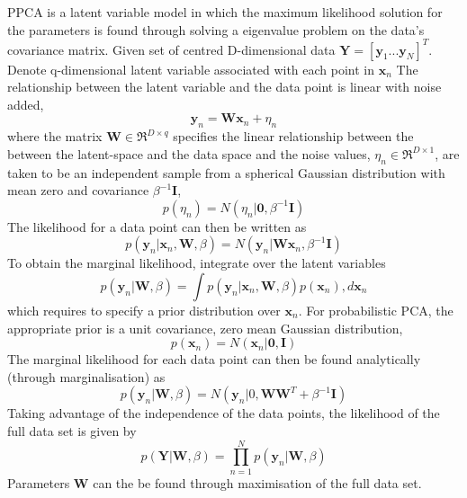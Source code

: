 \documentclass[ %
                    author={Dillon Keith Diep},
                supervisor={Dr. Carl Henrik Ek},
                    degree={MEng},
                     title={Assisted Content Generation for 3D Hair Geometry},
                  subtitle={[INCOMPLETE DRAFT, CONTAINS NOTES FROM RESEARCH]},
                      type={Research},
                      year={2014} ]{dissertation}
\begin{document}
\vspace{10cm}
PPCA is a latent variable model in which the maximum likelihood solution for the parameters is found through solving a eigenvalue problem on the data's covariance matrix.
Given set of centred D-dimensional data $\mathbf{Y}=[\mathbf{y}_1...\mathbf{y}_N]^T$. Denote q-dimensional latent variable associated with each point in $\mathbf{x}_n$
The relationship between the latent variable and the data point is linear with noise added,
\begin{equation}
\mathbf{y}_n=\mathbf{Wx}_n+\eta_n
\end{equation}
where the matrix $\mathbf{W}\in\Re^{D\times q}$ specifies the linear relationship between the between the latent-space and the data space and the noise values, $\eta_n\in\Re^{D\times 1}$, are taken to be an independent sample from a spherical Gaussian distribution with mean zero and covariance $\beta^{-1}\mathbf{I}$,
\begin{equation}
p(\eta_n)=N(\eta_n|\mathbf{0},\beta^{-1}\mathbf{I})
\end{equation}
The likelihood for a data point can then be written as 
\begin{equation}
p(\mathbf{y}_n|\mathbf{x}_n,\mathbf{W},\beta)=N(\mathbf{y}_n|\mathbf{Wx}_n,\beta^{-1}\mathbf{I})
\end{equation}
To obtain the marginal likelihood, integrate over the latent variables
\begin{equation}
p(\mathbf{y}_n|\mathbf{W},\beta)=\int p(\mathbf{y}_n|\mathbf{x}_n, \mathbf{W},\beta)p(\mathbf{x}_n),d\mathbf{x}_n
\end{equation}
which requires to specify a prior distribution over $\mathbf{x}_n$. For probabilistic PCA, the appropriate prior is a unit covariance, zero mean Gaussian distribution,
\begin{equation}
p(\mathbf{x}_n)=N(\mathbf{x}_n|\mathbf{0},\mathbf{I})
\end{equation}
The marginal likelihood for each data point can then be found analytically (through marginalisation) as
\begin{equation}
p(\mathbf{y}_n|\mathbf{W},\beta)=N(\mathbf{y}_n|0,\mathbf{WW}^T+\beta^{-1}\mathbf{I})
\end{equation}
Taking advantage of the independence of the data points, the likelihood of the full data set is given by 
\begin{equation}
p(\mathbf{Y}|\mathbf{W},\beta)=\prod^N_{n=1}p(\mathbf{y}_n|\mathbf{W},\beta)
\end{equation}
Parameters $\mathbf{W}$ can the be found through maximisation of the full data set.
\end{document}
